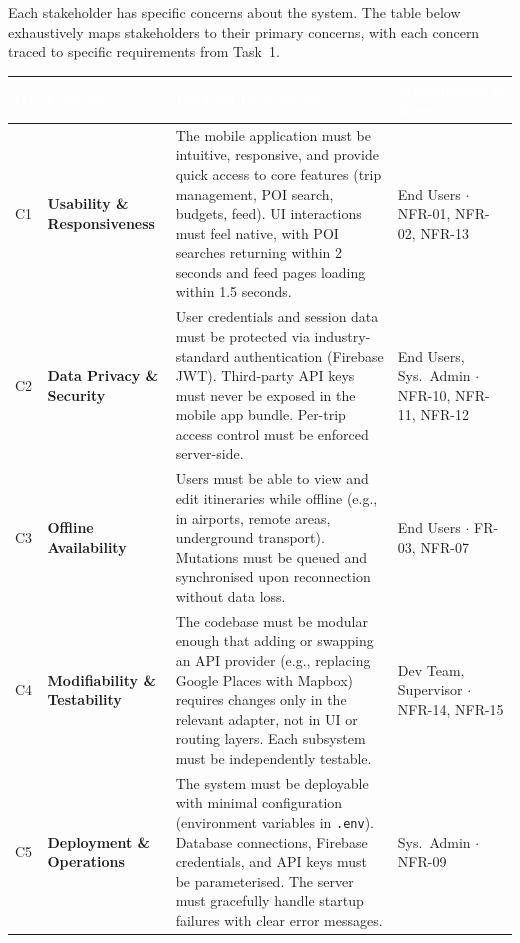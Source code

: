 \documentclass[12pt, a4paper]{article}
\newcommand{\thcell}[1]{\textcolor{white}{\textbf{\small #1}}}
\newcommand{\code}[1]{\texttt{\small #1}}
\newcommand{\reqid}[1]{\textsc{\small #1}}
\begin{document}
Each stakeholder has specific concerns about the system. The table below exhaustively maps stakeholders to their primary concerns, with each concern traced to specific requirements from Task~1.

\begin{longtable}{C{0.5cm} L{2.5cm} L{5.8cm} L{3.8cm}}
\toprule
{}
\thcell{ID} & \thcell{Concern} & \thcell{Detailed Description} & \thcell{Stakeholders \& Reqs} \\
\midrule
\endhead
\bottomrule
\endfoot

C1 & \textbf{Usability \& Responsiveness} & The mobile application must be intuitive, responsive, and provide quick access to core features (trip management, POI search, budgets, feed). UI interactions must feel native, with POI searches returning within 2 seconds and feed pages loading within 1.5 seconds. & End Users $\cdot$ \reqid{NFR-01}, \reqid{NFR-02}, \reqid{NFR-13} \\

C2 & \textbf{Data Privacy \& Security} & User credentials and session data must be protected via industry-standard authentication (Firebase JWT). Third-party API keys must never be exposed in the mobile app bundle. Per-trip access control must be enforced server-side. & End Users, Sys.~Admin $\cdot$ \reqid{NFR-10}, \reqid{NFR-11}, \reqid{NFR-12} \\

C3 & \textbf{Offline Availability} & Users must be able to view and edit itineraries while offline (e.g., in airports, remote areas, underground transport). Mutations must be queued and synchronised upon reconnection without data loss. & End Users $\cdot$ \reqid{FR-03}, \reqid{NFR-07} \\

C4 & \textbf{Modifiability \& Testability} & The codebase must be modular enough that adding or swapping an API provider (e.g., replacing Google Places with Mapbox) requires changes only in the relevant adapter, not in UI or routing layers. Each subsystem must be independently testable. & Dev Team, Supervisor $\cdot$ \reqid{NFR-14}, \reqid{NFR-15} \\

C5 & \textbf{Deployment \& Operations} & The system must be deployable with minimal configuration (environment variables in \code{.env}). Database connections, Firebase credentials, and API keys must be parameterised. The server must gracefully handle startup failures with clear error messages. & Sys.~Admin $\cdot$ \reqid{NFR-09} \\


\end{longtable}
\end{document}
